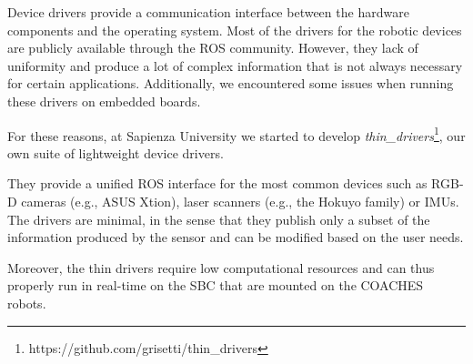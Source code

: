 Device drivers provide a communication interface between the hardware
components and the operating system. Most of the drivers for the
robotic devices are publicly available through the ROS
community. However, they lack of uniformity and produce a lot of
complex information that is not always necessary for certain
applications. Additionally, we encountered some issues when running
these drivers on embedded boards.

For these reasons, at Sapienza University we started to develop
\textit{thin\_drivers}\footnote{https://github.com/grisetti/thin\_drivers},
our own suite of lightweight device drivers.

They provide a unified ROS interface for the most common devices such
as RGB-D cameras (e.g., ASUS Xtion), laser scanners (e.g., the Hokuyo
family) or IMUs. The drivers are minimal, in the sense that they
publish only a subset of the information produced by the sensor and
can be modified based on the user needs.

Moreover, the thin drivers require low computational resources and can thus properly run in real-time on the SBC that are mounted on the COACHES robots.



